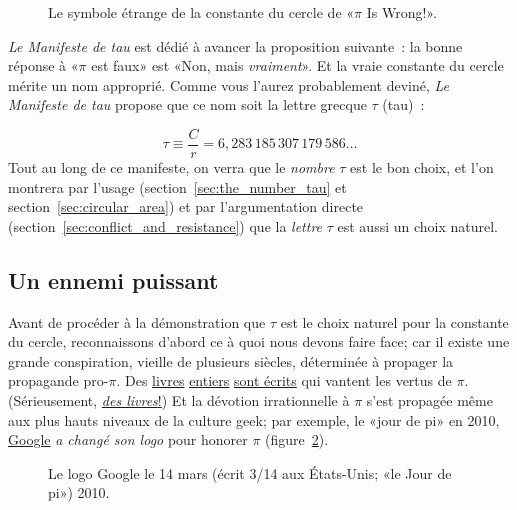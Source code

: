 \begin{figure}
\caption{Le symbole étrange de la constante du cercle de «\ns $\pi$ Is Wrong!\ns ».\label{fig:palais_tau}}
\end{figure}

\emph{Le Manifeste de tau} est dédié à avancer la proposition suivante~:  la bonne
réponse à «\ns $\pi$ est faux\ns » est «\ns Non, mais \emph{vraiment}\ns ». Et la vraie
constante du cercle mérite un nom approprié. Comme vous l'aurez probablement deviné,
\emph{Le Manifeste de tau} propose que ce nom soit la lettre grecque $\tau$
(tau)~:

\begin{equation}
\label{eq:tau}
\tau \equiv \frac{C}{r} = 6{,}283\,185\,307\,179\,586\ldots
\end{equation}
Tout au long de ce manifeste, on verra que le \emph{nombre} $\tau$ est
le bon choix, et l'on montrera par l'usage (section~\ref{sec:the_number_tau}
et section~\ref{sec:circular_area}) et par l'argumentation directe
(section~\ref{sec:conflict_and_resistance}) que la \emph{lettre} $\tau$ est aussi
un choix naturel.

\subsection{Un ennemi puissant} %
 \label{sec:a_powerful_enemy}
 
Avant de procéder à la démonstration que $\tau$ est le choix naturel pour la
constante du cercle, reconnaissons d'abord ce à quoi nous devons faire face\ns; car il existe
une grande conspiration, vieille de plusieurs siècles, déterminée à propager
la propagande pro-$\pi$. Des
\href{https://www.amazon.fr/fascinant-nombre-ESSAIS-SCIEN-ebook/dp/B07D3SYP5X/}{livres}
\href{https://www.amazon.fr/1-000-000-Décimales-Nombre-Plus-Connu/dp/B085DMM9XV/}{entiers}
\href{https://www.amazon.fr/Autour-du-nombre-pi-HR-ACT-SC-INDUS-ebook/dp/B081HGQSQJ/}{sont
écrits} qui vantent les vertus de $\pi$. (Sérieusement,
\href{https://www.amazon.com/exec/obidos/ISBN=0802713327/}{\emph{des
livres}\ns!}) Et la dévotion irrationnelle à $\pi$ s'est propagée même aux
plus hauts niveaux de la culture geek\ns; par exemple, le «\ns jour de pi\ns » en 2010,
\href{https://www.google.com/}{Google} \emph{a changé son logo} pour honorer
$\pi$ (figure~\ref{fig:google_pi_day.}).

\begin{figure}
\begin{center}
\end{center}
\caption{Le logo Google le 14 mars (écrit 3/14 aux États-Unis\ns; «\ns le Jour de
pi\ns ») 2010.\label{fig:google_pi_day.}}
\end{figure}

